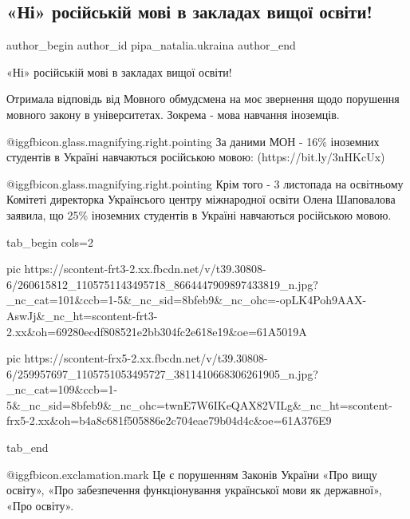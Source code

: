 
 
 
 
 
 
\subsection{«Ні» російській мові в закладах вищої освіти!}
\label{sec:23_11_2021.fb.pipa_natalia.ukraina.1.jazyk_vuzy}
 
\ifcmt
 author_begin
   author_id pipa_natalia.ukraina
 author_end
\fi

«Ні» російській мові в закладах вищої освіти!

Отримала відповідь від Мовного обмудсмена на моє звернення щодо порушення
мовного закону в університетах. Зокрема - мова навчання іноземців.

 @igg{fbicon.glass.magnifying.right.pointing} За даними МОН - 16\% іноземних студентів в Україні навчаються російською
мовою: (https://bit.ly/3nHKcUx)

 @igg{fbicon.glass.magnifying.right.pointing} Крім того - 3 листопада на освітньому Комітеті директорка Українсього центру
міжнародної освіти Олена Шаповалова заявила, що 25\% іноземних студентів в
Україні навчаються російською мовою.

\ifcmt
  tab_begin cols=2

     pic https://scontent-frt3-2.xx.fbcdn.net/v/t39.30808-6/260615812_1105751143495718_8664447909897433819_n.jpg?_nc_cat=101&ccb=1-5&_nc_sid=8bfeb9&_nc_ohc=-opLK4Poh9AAX-AswJj&_nc_ht=scontent-frt3-2.xx&oh=69280ecdf808521e2bb304fc2e618e19&oe=61A5019A

     pic https://scontent-frx5-2.xx.fbcdn.net/v/t39.30808-6/259957697_1105751053495727_3811410668306261905_n.jpg?_nc_cat=109&ccb=1-5&_nc_sid=8bfeb9&_nc_ohc=twnE7W6IKeQAX82VILg&_nc_ht=scontent-frx5-2.xx&oh=b4a8c681f505886e2c704eae79b04d4c&oe=61A376E9

  tab_end
\fi

@igg{fbicon.exclamation.mark} Це є порушенням Законів України «Про вищу освіту», «Про забезпечення
функціонування української мови як державної», «Про освіту». 


